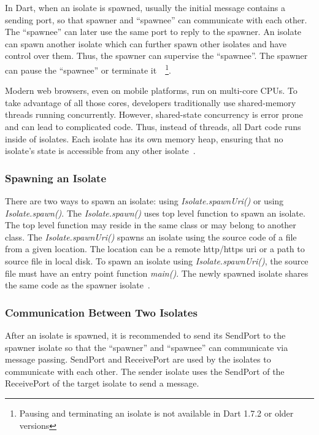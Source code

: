   In Dart, when an isolate is spawned, usually the initial message contains a sending port, so that spawner and “spawnee” can communicate with each other. The “spawnee” can later use the same port to reply to the spawner. An isolate can spawn another isolate which can further spawn other isolates and have control over them. Thus, the spawner can supervise the “spawnee”. The spawner can pause the “spawnee” or terminate it~\cite{dartApiIsolate}~\footnote{Pausing and terminating an isolate is not available in Dart 1.7.2 or older versions}.

  Modern web browsers, even on mobile platforms, run on multi-core CPUs. To take advantage of all those cores, developers traditionally use shared-memory threads running concurrently. However, shared-state concurrency is error prone and can lead to complicated code. Thus, instead of threads, all Dart code runs inside of isolates. Each isolate has its own memory heap, ensuring that no isolate’s state is accessible from any other isolate~\parencite{laddWalrath}.

  \subsubsection{Spawning an Isolate}
    There are two ways to spawn an isolate: using \emph{Isolate.spawnUri()} or using \emph{Isolate.spawn()}. The \emph{Isolate.spawn()} uses top level function to spawn an isolate. The top level function may reside in the same class or may belong to another class. The \emph{Isolate.spawnUri()} spawns an isolate using the source code of a file from a given location. The location can be a remote http/https \acrshort{uri} or a path to source file in local disk. To spawn an isolate using \emph{Isolate.spawnUri()}, the source file must have an entry point function \emph{main()}.
    The newly spawned isolate shares the same code as the spawner isolate~\cite{dartApiIsolate}.

  \subsubsection{Communication Between Two Isolates}
  After an isolate is spawned, it is recommended to send its SendPort to the spawner isolate so that the “spawner” and “spawnee” can communicate via message passing. SendPort and ReceivePort are used by the isolates to communicate with each other. The sender isolate uses the SendPort of the ReceivePort of the target isolate to send a message.

